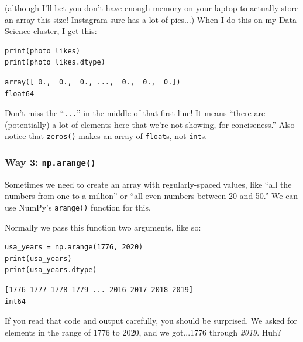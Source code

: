 (although I'll bet you don't have enough memory on your laptop to actually
store an array this size! Instagram sure has a lot of pics...) When I do this
on my Data Science cluster, I get this:

\begin{Verbatim}[fontsize=\small,samepage=true,frame=single,framesep=3mm]
print(photo_likes)
print(photo_likes.dtype)
\end{Verbatim}

\begin{Verbatim}[fontsize=\small,samepage=true,frame=leftline,framesep=5mm,framerule=1mm]
array([ 0.,  0.,  0., ...,  0.,  0.,  0.])
float64
\end{Verbatim}

Don't miss the ``\texttt{...}'' in the middle of that first line! It means
``there are (potentially) a lot of elements here that we're not showing, for
conciseness.'' Also notice that \texttt{zeros()} makes an array of
\texttt{float}s, not \texttt{int}s.


\subsubsection{Way 3: \texttt{np.arange()}}

Sometimes we need to create an array with regularly-spaced values, like ``all
the numbers from one to a million'' or ``all even numbers between 20 and 50.''
We can use NumPy's \texttt{arange()} function for this.

Normally we pass this function two arguments, like so:

\begin{Verbatim}[fontsize=\small,samepage=true,frame=single,framesep=3mm]
usa_years = np.arange(1776, 2020)
print(usa_years)
print(usa_years.dtype)
\end{Verbatim}

\begin{Verbatim}[fontsize=\small,samepage=true,frame=leftline,framesep=5mm,framerule=1mm]
[1776 1777 1778 1779 ... 2016 2017 2018 2019]
int64
\end{Verbatim}

If you read that code and output carefully, you should be surprised. We asked
for elements in the range of 1776 to 2020, and we got...1776 through
\textit{2019}. Huh?



